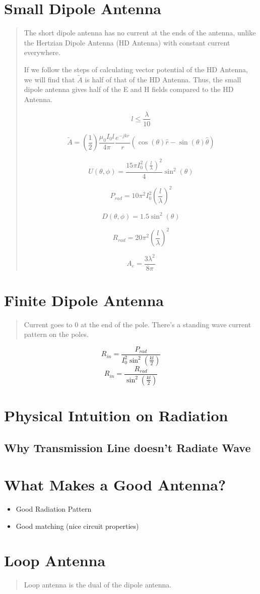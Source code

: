 \documentclass{article} %
\begin{document}
\section{Small Dipole Antenna}

\begin{quote}
    The short dipole antenna has no current at the ends of the antenna, unlike the Hertzian Dipole Antenna (HD Antenna) with constant current everywhere.

    If we follow the steps of calculating vector potential of the HD Antenna, we will find that $\tilde{A}$ is half of that of the HD Antenna. Thus, the small dipole antenna gives half of the E and H fields compared to the HD Antenna.

    \[l \leq \frac{\lambda}{10}\]

    \[\tilde{A} = \left(\frac{1}{2}\right)\frac{\mu_0 I_0 l}{4 \pi}\frac{e^{-jkr}}{r}(\cos(\theta) \hat{r} -\sin(\theta) \hat{\theta})\]

    \[U(\theta, \phi) = \frac{15 \pi I_0 ^2\left(\frac{l}{\lambda}\right)^2}{4} \sin^2(\theta)\]

    \[P_{rad} = 10 \pi^2 I_0^2 \left(\frac{l}{\lambda}\right)^2\]

    \[D(\theta, \phi) = 1.5 \sin^2(\theta)\]

    \[R_{rad} = 20 \pi^2 \left(\frac{l}{\lambda}\right)^2\]

    \[A_e = \frac{3 \lambda ^2}{8 \pi}\]
\end{quote}

\section{Finite Dipole Antenna}
\begin{quote}
    Current goes to 0 at the end of the pole. There's a standing wave current pattern on the poles.
\end{quote}


\[R_{in} = \frac{P_{rad}}{I_0^2 \sin^2\left(\frac{kl}{2}\right)}\]
\[R_{in} = \frac{R_{rad}}{\sin^2\left(\frac{kl}{2}\right)}\]

\section{Physical Intuition on Radiation}
\subsection{Why Transmission Line doesn't Radiate Wave}


\section{What Makes a Good Antenna?}
\begin{itemize}
    \item Good Radiation Pattern
    \item Good matching (nice circuit properties)
\end{itemize}

\section{Loop Antenna}
\begin{quote}
    Loop antenna is the dual of the dipole antenna.
\end{quote}
\end{document}
